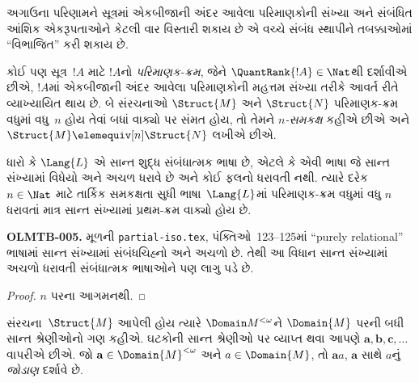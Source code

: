 અગાઉના પરિણામને સૂત્રમાં એકબીજાની અંદર આવેલા પરિમાણકોની સંખ્યા
અને સંબંધિત આંશિક એકરૂપતાઓને કેટલી વાર વિસ્તારી શકાય છે એ વચ્ચે સંબંધ
સ્થાપીને તબક્કાઓમાં ``વિભાજિત'' કરી શકાય છે.

\begin{defn}
  કોઈ પણ સૂત્ર~$!A$ માટે $!A$નો \emph{પરિમાણક-ક્રમ}, જેને
  $\QuantRank{!A} \in \Nat$થી દર્શાવીએ છીએ, $!A$માં એકબીજાની અંદર
  આવેલા પરિમાણકોની મહત્તમ સંખ્યા તરીકે આવર્ત રીતે વ્યાખ્યાયિત થાય છે.
  બે સંરચનાઓ $\Struct{M}$ અને $\Struct{N}$ પરિમાણક-ક્રમ વધુમાં
  વધુ~$n$ હોય તેવાં બધાં વાક્યો પર સંમત હોય, તો તેમને
  \emph{$n$-સમકક્ષ} કહીએ છીએ અને $\Struct{M} \elemequiv[n]
  \Struct{N}$ લખીએ છીએ.
\end{defn}

\begin{prop}
  ધારો કે $\Lang{L}$ એ સાન્ત શુદ્ધ સંબંધાત્મક ભાષા છે, એટલે કે
  એવી ભાષા જે સાન્ત સંખ્યામાં વિધેયો અને અચળ ધરાવે છે અને કોઈ
  ફલનો ધરાવતી નથી. ત્યારે દરેક $n \in \Nat$ માટે તાર્કિક સમકક્ષતા
  સુધી ભાષા~$\Lang{L}$માં પરિમાણક-ક્રમ વધુમાં વધુ $n$ ધરાવતાં માત્ર સાન્ત
  સંખ્યામાં પ્રથમ-ક્રમ વાક્યો હોય છે.
  \begin{editorial}
\textbf{OLMTB-005.} મૂળની \texttt{partial-iso.tex}, પંક્તિઓ~123--125માં “purely relational” ભાષામાં સાન્ત સંખ્યામાં સંબંધચિહ્નો અને અચળો છે. તેથી આ વિધાન સાન્ત સંખ્યામાં અચળો ધરાવતી સંબંધાત્મક ભાષાઓને પણ લાગુ પડે છે.
\end{editorial}
\end{prop}

\begin{proof}
  $n$ પરના આગમનથી.
\end{proof}

\begin{defn}
  સંરચના~$\Struct{M}$ આપેલી હોય ત્યારે $\Domain M^{<\omega}$ને
  $\Domain{M}$ પરની બધી સાન્ત શ્રેણીઓનો ગણ કહીએ. ઘટકોની સાન્ત
  શ્રેણીઓ પર વ્યાપ્ત થવા આપણે $\mathbf{a}, \mathbf{b}, \mathbf{c},
  \ldots$ વાપરીએ છીએ. જો $\mathbf{a} \in \Domain{M}^{<\omega}$ અને
  $a \in \Domain{M}$, તો $\mathbf{a}a$, $\mathbf{a}$ સાથે $a$નું
  \emph{જોડાણ} દર્શાવે છે.
\end{defn}

